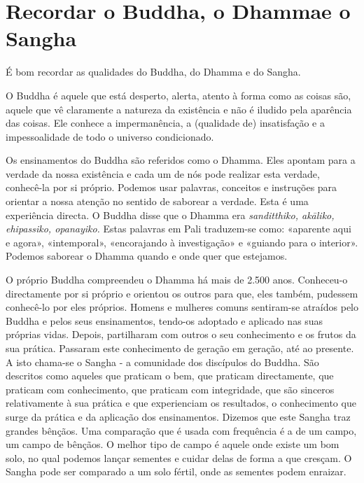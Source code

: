 \chapter[Recordar o Buddha, o Dhamma e o Sangha]{Recordar o Buddha, o Dhamma\newline e o Sangha}

É bom recordar as qualidades do Buddha, do Dhamma e do Sangha.

O Buddha é aquele que está desperto, alerta, atento à forma como as
coisas são, aquele que vê claramente a natureza da existência e não é
iludido pela aparência das coisas. Ele conhece a impermanência, a
(qualidade de) insatisfação e a impessoalidade de todo o universo
condicionado.

Os ensinamentos do Buddha são referidos como o Dhamma. Eles apontam para
a verdade da nossa existência e cada um de nós pode realizar esta
verdade, conhecê-la por si próprio. Podemos usar palavras, conceitos e
instruções para orientar a nossa atenção no sentido de saborear a
verdade. Esta é uma experiência directa. O Buddha disse que o Dhamma era
\emph{sanditthiko, akāliko, ehipassiko, opanayiko.} Estas palavras em
Pali traduzem-se como: «aparente aqui e agora», «intemporal»,
«encorajando à investigação» e «guiando para o interior». Podemos
saborear o Dhamma quando e onde quer que estejamos.

O próprio Buddha compreendeu o Dhamma há mais de 2.500 anos. Conheceu-o
directamente por si próprio e orientou os outros para que, eles também,
pudessem conhecê-lo por eles próprios. Homens e mulheres comuns
sentiram-se atraídos pelo Buddha e pelos seus ensinamentos, tendo-os
adoptado e aplicado nas suas próprias vidas. Depois, partilharam com
outros o seu conhecimento e os frutos da sua prática. Passaram este
conhecimento de geração em geração, até ao presente. A isto chama-se o
Sangha - a comunidade dos discípulos do Buddha. São descritos como
aqueles que praticam o bem, que praticam directamente, que praticam com
conhecimento, que praticam com integridade, que são sinceros
relativamente à sua prática e que experienciam os resultados, o
conhecimento que surge da prática e da aplicação dos ensinamentos.
Dizemos que este Sangha traz grandes bênçãos. Uma comparação que é usada
com frequência é a de um campo, um campo de bênçãos. O melhor tipo de
campo é aquele onde existe um bom solo, no qual podemos lançar sementes
e cuidar delas de forma a que cresçam. O Sangha pode ser comparado a um
solo fértil, onde as sementes podem enraizar.

